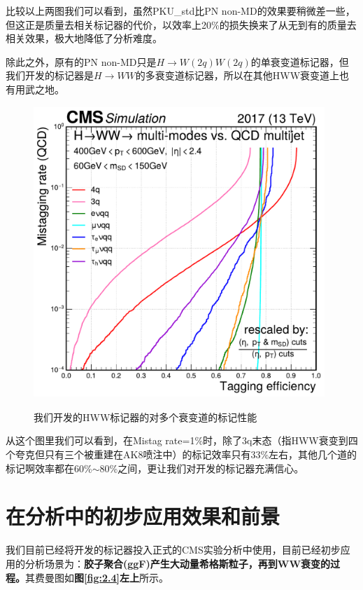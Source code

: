 比较以上两图我们可以看到，虽然PKU\_std比PN non-MD的效果要稍微差一些，但这正是质量去相关标记器的代价，以效率上20\%的损失换来了从无到有的质量去相关效果，极大地降低了分析难度。

除此之外，原有的PN non-MD只是$H\to W(2q)W(2q)$的单衰变道标记器，但我们开发的标记器是$H\to WW$的多衰变道标记器，所以在其他HWW衰变道上也有用武之地。
\begin{figure}[H]
 \centering
 \caption{我们开发的HWW标记器的对多个衰变道的标记性能}
 \includegraphics[height=11cm, width=11cm]{pictures/ROC_multi-modes_PKU_std.pdf}
 \label{fig:5.5}
\end{figure}
从这个图里我们可以看到，在Mistag rate=1\%时，除了3q末态（指HWW衰变到四个夸克但只有三个被重建在AK8喷注中）的标记效率只有33\%左右，其他几个道的标记啊效率都在60\%$\sim$80\%之间，更让我们对开发的标记器充满信心。
\section{在分析中的初步应用效果和前景}
我们目前已经将开发的标记器投入正式的CMS实验分析中使用，目前已经初步应用的分析场景为：\textbf{胶子聚合(ggF)产生大动量希格斯粒子，再到WW衰变的过程。}其费曼图如\textbf{图\ref{fig:2.4}左上}所示。

